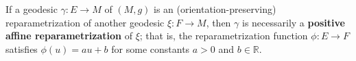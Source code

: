 If a geodesic $\gamma: E \rightarrow M$ of $(M, g)$ is an (orientation-preserving) reparametrization of another geodesic $\xi: F \rightarrow M$, then $\gamma$ is necessarily a \textbf{positive affine reparametrization} of $\xi$; that is, the reparametrization function $\phi: E \rightarrow F$ satisfies $\phi(u) = au + b$ for some constants $a > 0$ and $b \in \mathbb{R}$.
